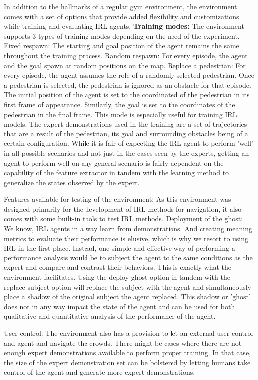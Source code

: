 In addition to the hallmarks of a regular gym environment, the environment comes with a set of options that provide added flexibility and customizations while training and evaluating IRL agents.
\textbf{Training modes:}
The environment supports 3 types of training modes depending on the need of the experiment. 
Fixed respawn: The starting and goal position of the agent remains the same throughout the training process.
Random respawn: For every episode, the agent and the goal spawn at random positions on the map. 
Replace a pedestrian: For every episode, the agent assumes the role of a randomly selected pedestrian. Once a pedestrian is selected, the pedestrian is ignored as an obstacle for that episode. The initial position of the agent is set to the coordinated of the pedestrian in its first frame of appearance. Similarly, the goal is set to the coordinates of the pedestrian in the final frame.
This mode is especially useful for training IRL models. The expert demonstrations used in the training are a set of trajectories that are a result of the pedestrian, its goal and surrounding obstacles being of a certain configuration. While it is fair of expecting the IRL agent to perform 'well' in all possible scenarios and not just in the cases seen by the experts, getting an agent to perform well on any general scenario is fairly dependent on the capability of the feature extractor in tandem with the learning method to generalize the states observed by the expert.  

Features available for testing of the environment:
As this environment was designed primarily for the development of IRL methods for navigation, it also comes with some built-in tools to test IRL methods.
Deployment of the ghost:
We know, IRL agents in a way learn from demonstrations. And creating meaning metrics to evaluate their performance is elusive, which is why we resort to using IRL in the first place. Instead, one simple and effective way of performing a performance analysis would be to subject the agent to the same conditions as the expert and compare and contrast their behaviors. This is exactly what the environment facilitates. Using the deploy ghost option in tandem with the replace-subject option will replace the subject with the agent and simultaneously place a shadow of the original subject the agent replaced. This shadow or 'ghost' does not in any way impact the state of the agent and can be used for both qualitative and quantitative analysis of the performance of the agent. 

User control:
The environment also has a provision to let an external user control and agent and navigate the crowds. There might be cases where there are not enough expert demonstrations available to perform proper training. In that case, the size of the expert demonstration set can be bolstered by letting humans take control of the agent and generate more expert demonstrations. 

